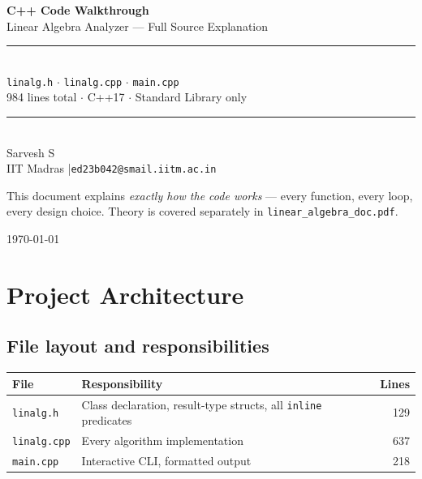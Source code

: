 \documentclass[12pt, a4paper]{article}
\newcommand{\code}[1]{\texttt{\small#1}}
\begin{document}
\begin{titlepage}
\centering\vspace*{2cm}
{\huge\bfseries\color{codeblue}C++ Code Walkthrough}\\[0.5em]
{\large Linear Algebra Analyzer --- Full Source Explanation}\\[2em]
\rule{0.7\textwidth}{0.5pt}\\[1.5em]
{\normalsize
  \texttt{linalg.h} $\cdot$ \texttt{linalg.cpp} $\cdot$ \texttt{main.cpp}\\[0.3em]
  984 lines total $\cdot$ C++17 $\cdot$ Standard Library only
}\\[1.5em]
\rule{0.7\textwidth}{0.5pt}\\[2em]
{\large Sarvesh S}\\[0.4em]
{\small IIT Madras \quad|\quad \texttt{ed23b042@smail.iitm.ac.in}}\\[3em]
\begin{tcolorbox}[colback=lightblue, colframe=codeblue, width=0.75\textwidth, arc=5pt]
\centering\small
This document explains \emph{exactly how the code works} ---
every function, every loop, every design choice.
Theory is covered separately in \texttt{linear\_algebra\_doc.pdf}.
\end{tcolorbox}
\vfill{\small\color{gray}\today}
\end{titlepage}

\tableofcontents
\newpage

\section{Project Architecture}

\subsection{File layout and responsibilities}

\begin{center}
\small
\begin{tabular}{llr}
\toprule
File & Responsibility & Lines \\
\midrule
\texttt{linalg.h}   & Class declaration, result-type structs, all \code{inline} predicates & 129 \\
\texttt{linalg.cpp} & Every algorithm implementation & 637 \\
\texttt{main.cpp}   & Interactive CLI, formatted output & 218 \\
\bottomrule
\end{tabular}
\end{center}
\end{document}
